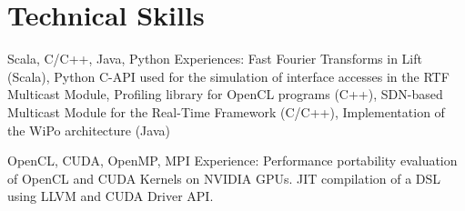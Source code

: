\documentclass[11pt,a4paper,sans]{moderncv}        %
\begin{document}
\section{Technical Skills}
					{Scala, C/C++, Java, Python}{}{}{}
					{Experiences:
					 Fast Fourier Transforms in Lift (Scala),
           Python C-API used for the simulation of interface accesses in the RTF Multicast Module,
					 Profiling library for OpenCL programs (C++),
				 	 SDN-based Multicast Module for the Real-Time Framework (C/C++),
					 Implementation of the WiPo architecture (Java)
					}

					{OpenCL, CUDA, OpenMP, MPI}{}{}{}
					{Experience:
					 Performance portability evaluation of OpenCL and CUDA Kernels on NVIDIA GPUs. JIT compilation of a DSL using LLVM and CUDA Driver API.
					}

\cvline{}{}{}
\cvline{}{}{}
\cvline{}{}{}
 
\end{document}
